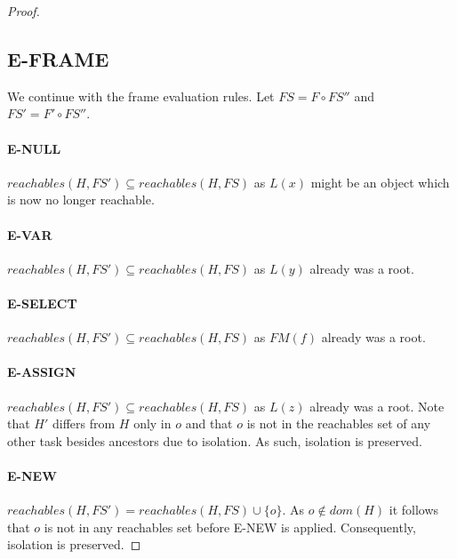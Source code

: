 \begin{proof}
\subsection{E-FRAME}
We continue with the frame evaluation rules. Let $FS = F \circ FS''$ and $FS' = F' \circ FS''$.

\paragraph{E-NULL}
$reachables(H, FS') \subseteq reachables(H, FS)$ as $L(x)$ might be an object which is now no longer reachable.

\paragraph{E-VAR}
$reachables(H, FS') \subseteq reachables(H, FS)$ as $L(y)$ already was a root.

\paragraph{E-SELECT}
$reachables(H, FS') \subseteq reachables(H, FS)$ as $FM(f)$ already was a root.

\paragraph{E-ASSIGN}
$reachables(H, FS') \subseteq reachables(H, FS)$ as $L(z)$ already was a root. Note that $H'$ differs from $H$ only in $o$ and that $o$ is not in the reachables set of any other task besides ancestors due to isolation. As such, isolation is preserved.

\paragraph{E-NEW}
$reachables(H, FS') = reachables(H, FS) \cup \{o\}$. As $o \not \in dom(H)$ it follows that $o$ is not in any reachables set before E-NEW is applied. Consequently, isolation is preserved.

\end{proof} %
